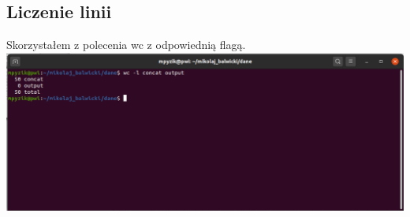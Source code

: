 \documentclass[a4paper,11pt]{article}
\begin{document}
\subsection{Liczenie linii}
Skorzystałem z polecenia wc z odpowiednią flagą.\\
\includegraphics[width=\textwidth]{wc.png}
\end{document}
